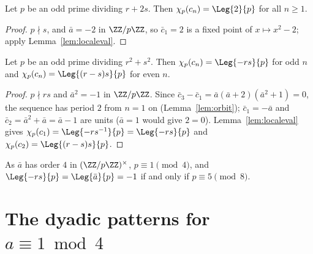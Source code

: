 \begin{lemma}[Primes of $r + 2s$]
  \label{lem:pat-r2s}
  \leanok
  Let $p$ be an odd prime dividing $r + 2s$. Then $\chi_p(c_n) = \Leg{2}{p}$ for all $n \ge 1$.
\end{lemma}
\begin{proof}
  \leanok
  $p \nmid s$, and $\bar a = -2$ in $\ZZ/p\ZZ$, so $\bar c_1 = 2$ is a fixed point of
  $x \mapsto x^2 - 2$; apply Lemma~\ref{lem:localeval}.
\end{proof}

\begin{lemma}[Primes of $r^2 + s^2$]
  \label{lem:pat-r2s2}
  \leanok
  Let $p$ be an odd prime dividing $r^2 + s^2$. Then $\chi_p(c_n) = \Leg{-rs}{p}$ for odd $n$ and
  $\chi_p(c_n) = \Leg{(r - s)s}{p}$ for even $n$.
\end{lemma}
\begin{proof}
  \leanok
  $p \nmid rs$ and $\bar a^2 = -1$ in $\ZZ/p\ZZ$. Since
  $\bar c_3 - \bar c_1 = \bar a(\bar a + 2)(\bar a^2 + 1) = 0$, the sequence has period $2$ from
  $n = 1$ on (Lemma~\ref{lem:orbit}); $\bar c_1 = -\bar a$ and $\bar c_2 = \bar a^2 + \bar a =
  \bar a - 1$ are units ($\bar a = 1$ would give $2 = 0$). Lemma~\ref{lem:localeval} gives
  $\chi_p(c_1) = \Leg{-r s^{-1}}{p} = \Leg{-rs}{p}$ and $\chi_p(c_2) = \Leg{(r-s)s}{p}$.
\end{proof}

\begin{remark}
  As $\bar a$ has order $4$ in $(\ZZ/p\ZZ)^\times$, $p \equiv 1 \pmod 4$, and
  $\Leg{-rs}{p} = \Leg{\bar a}{p} = -1$ if and only if $p \equiv 5 \pmod 8$.
\end{remark}

\section{The dyadic patterns for \texorpdfstring{$a \equiv 1 \bmod 4$}{a = 1 mod 4}}


